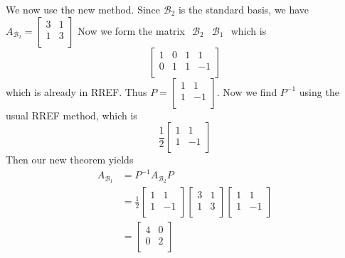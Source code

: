 \documentclass{article}
\begin{document}
\begin{example}
  We now use the new method. Since $\mathcal{B}_2$ is the standard basis, we have $A_{\mathcal{B}_2} =
  \begin{bmatrix}
    3 & 1\\
    1 & 3\\
  \end{bmatrix}$ Now we form the matrix $
  \begin{array}{c|c}
    \mathcal{B}_2 & \mathcal{B}_1
  \end{array}$ which is \[
    \left[
      \begin{array}{cc|cc}
        1 & 0 & 1 & 1\\
        0 & 1 & 1 & -1\\
    \end{array}\right]
  \] which is already in RREF. Thus $P =
  \begin{bmatrix}
    1 & 1\\
    1 & -1\\
  \end{bmatrix}$. Now we find $P^{-1}$ using the usual RREF method, which is \[
    \frac{1}{2}
    \begin{bmatrix}
      1 & 1\\
      1 & -1\\
    \end{bmatrix}
  \] Then our new theorem yields
  \begin{align*}
    A_{\mathcal{B}_1} &= P^{-1}A_{\mathcal{B}_2}P\\
    &= \frac{1}{2}
    \begin{bmatrix}
      1 & 1\\
      1 & -1\\
    \end{bmatrix}
    \begin{bmatrix}
      3 & 1\\
      1 & 3\\
    \end{bmatrix}
    \begin{bmatrix}
      1 & 1\\
      1 & -1\\
    \end{bmatrix}\\
    &=
    \begin{bmatrix}
      4 & 0\\
      0 & 2\\
    \end{bmatrix}
  \end{align*}


\end{example}
\end{document}
